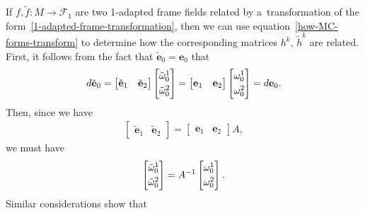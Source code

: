 \documentclass[pdftex]{sigma}
\numberwithin{equation}{section}
\theoremstyle{definition}
\begin{document}
If $f, \tilde{f}:M \to \mathcal{F}_1$ are two 1-adapted frame f\/ields related by a~transformation of the
form~\eqref{1-adapted-frame-transformation}, then we can use equation~\eqref{how-MC-forms-transform} to determine how
the corresponding matrices $h^k$, $\tilde{h}^k$ are related.
First, it follows from the fact that $\tilde{\mathbf{e}}_0 = \mathbf{e}_0$ that
\begin{gather*}
d\tilde{\mathbf{e}}_0 =
\begin{bmatrix}
\tilde{\mathbf{e}}_1 & \tilde{\mathbf{e}}_2
\end{bmatrix}
\begin{bmatrix}
\tilde{\omega}^1_0
\vspace{1mm}\\
\tilde{\omega}^2_0
\end{bmatrix}
=
\begin{bmatrix}
\mathbf{e}_1 & \mathbf{e}_2
\end{bmatrix}
\begin{bmatrix}
\omega^1_0
\vspace{1mm}\\
\omega^2_0
\end{bmatrix}
= d\mathbf{e}_0.
\end{gather*}
Then, since we have
\begin{gather*}
\begin{bmatrix}
\tilde{\mathbf{e}}_1 & \tilde{\mathbf{e}}_2
\end{bmatrix}
=
\begin{bmatrix}
\mathbf{e}_1 & \mathbf{e}_2
\end{bmatrix}
A,
\end{gather*}
we must have
\begin{gather}
\begin{bmatrix}
\tilde{\omega}^1_0
\vspace{1mm}\\
\tilde{\omega}^2_0
\end{bmatrix}
= A^{-1}
\begin{bmatrix}
\omega^1_0
\vspace{1mm}\\
\omega^2_0
\end{bmatrix}.
\label{semi-basic-trans}
\end{gather}
Similar considerations show that
\end{document}
